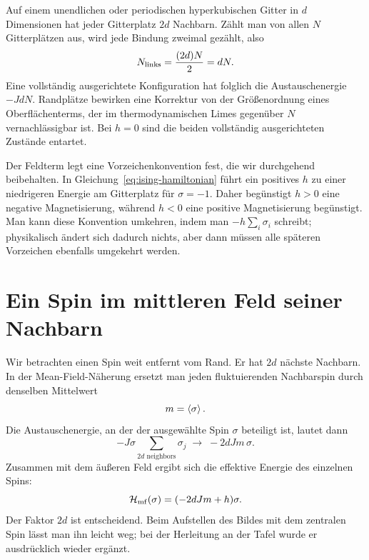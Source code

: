 Auf einem unendlichen oder periodischen hyperkubischen Gitter in \(d\) Dimensionen hat jeder Gitterplatz \(2d\) Nachbarn. Zählt man von allen \(N\) Gitterplätzen aus, wird jede Bindung zweimal gezählt, also
\begin{equation}
N_{\rm links}=\frac{(2d)N}{2}=dN.
\label{eq:number-links}
\end{equation}
Eine vollständig ausgerichtete Konfiguration hat folglich die Austauschenergie \(-JdN\). Randplätze bewirken eine Korrektur von der Größenordnung eines Oberflächenterms, der im thermodynamischen Limes gegenüber \(N\) vernachlässigbar ist. Bei \(h=0\) sind die beiden vollständig ausgerichteten Zustände entartet.

Der Feldterm legt eine Vorzeichenkonvention fest, die wir durchgehend beibehalten. In Gleichung~\eqref{eq:ising-hamiltonian} führt ein positives \(h\) zu einer niedrigeren Energie am Gitterplatz für \(\sigma=-1\). Daher begünstigt \(h>0\) eine negative Magnetisierung, während \(h<0\) eine positive Magnetisierung begünstigt. Man kann diese Konvention umkehren, indem man \(-h\sum_i\sigma_i\) schreibt; physikalisch ändert sich dadurch nichts, aber dann müssen alle späteren Vorzeichen ebenfalls umgekehrt werden.

\begin{classroomqa}
\end{classroomqa}

\section{Ein Spin im mittleren Feld seiner Nachbarn}

Wir betrachten einen Spin weit entfernt vom Rand. Er hat \(2d\) nächste Nachbarn. In der Mean-Field-Näherung ersetzt man jeden fluktuierenden Nachbarspin durch denselben Mittelwert
\begin{equation}
m=\left\langle\sigma\right\rangle.
\end{equation}
Die Austauschenergie, an der der ausgewählte Spin \(\sigma\) beteiligt ist, lautet dann
\begin{equation}
-J\sigma\sum_{\text{\(2d\) neighbors}}\sigma_j
\;\longrightarrow\;-2dJm\,\sigma.
\end{equation}
Zusammen mit dem äußeren Feld ergibt sich die effektive Energie des einzelnen Spins:
\begin{equation}
\mathcal H_{\rm mf}(\sigma)=(-2dJm+h)\sigma.
\label{eq:mean-field-one-spin}
\end{equation}
Der Faktor \(2d\) ist entscheidend. Beim Aufstellen des Bildes mit dem zentralen Spin lässt man ihn leicht weg; bei der Herleitung an der Tafel wurde er ausdrücklich wieder ergänzt.


